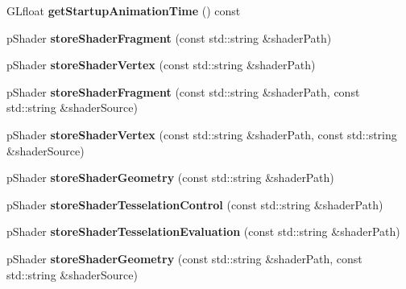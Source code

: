 \begin{DoxyCompactItemize}
\item 
\hypertarget{classfillwave_1_1Engine_acb3c6c716c79148844d95de53dd76977}{}G\+Lfloat {\bfseries get\+Startup\+Animation\+Time} () const \label{classfillwave_1_1Engine_acb3c6c716c79148844d95de53dd76977}

\item 
\hypertarget{classfillwave_1_1Engine_a5ba05b3ad8f87b5a91dffe0abfefc586}{}p\+Shader {\bfseries store\+Shader\+Fragment} (const std\+::string \&shader\+Path)\label{classfillwave_1_1Engine_a5ba05b3ad8f87b5a91dffe0abfefc586}

\item 
\hypertarget{classfillwave_1_1Engine_a993e9b3f716bb832d017df28b76e949c}{}p\+Shader {\bfseries store\+Shader\+Vertex} (const std\+::string \&shader\+Path)\label{classfillwave_1_1Engine_a993e9b3f716bb832d017df28b76e949c}

\item 
\hypertarget{classfillwave_1_1Engine_a198587bb1ba07669dc9662f2a77ef23a}{}p\+Shader {\bfseries store\+Shader\+Fragment} (const std\+::string \&shader\+Path, const std\+::string \&shader\+Source)\label{classfillwave_1_1Engine_a198587bb1ba07669dc9662f2a77ef23a}

\item 
\hypertarget{classfillwave_1_1Engine_a63be33b71b6541023cc986e12a20835a}{}p\+Shader {\bfseries store\+Shader\+Vertex} (const std\+::string \&shader\+Path, const std\+::string \&shader\+Source)\label{classfillwave_1_1Engine_a63be33b71b6541023cc986e12a20835a}

\item 
\hypertarget{classfillwave_1_1Engine_a0597b16a02320880925f66a85dddd154}{}p\+Shader {\bfseries store\+Shader\+Geometry} (const std\+::string \&shader\+Path)\label{classfillwave_1_1Engine_a0597b16a02320880925f66a85dddd154}

\item 
\hypertarget{classfillwave_1_1Engine_a7157ddacfcb0dc57f905dd55c5e8298c}{}p\+Shader {\bfseries store\+Shader\+Tesselation\+Control} (const std\+::string \&shader\+Path)\label{classfillwave_1_1Engine_a7157ddacfcb0dc57f905dd55c5e8298c}

\item 
\hypertarget{classfillwave_1_1Engine_a92e54f7f0ff3fb02d39fcff1e24508fc}{}p\+Shader {\bfseries store\+Shader\+Tesselation\+Evaluation} (const std\+::string \&shader\+Path)\label{classfillwave_1_1Engine_a92e54f7f0ff3fb02d39fcff1e24508fc}

\item 
\hypertarget{classfillwave_1_1Engine_a0397857b8de836c68499c88612756e61}{}p\+Shader {\bfseries store\+Shader\+Geometry} (const std\+::string \&shader\+Path, const std\+::string \&shader\+Source)\label{classfillwave_1_1Engine_a0397857b8de836c68499c88612756e61}


\end{DoxyCompactItemize}
